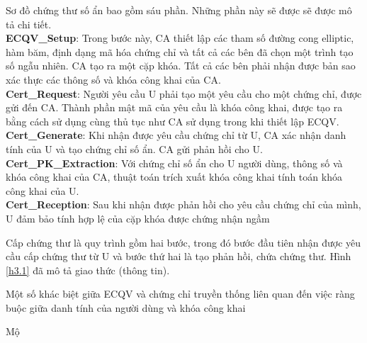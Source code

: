 \documentclass[a4paper,12pt]{report}
\begin{document}
Sơ đồ chứng thư số ẩn bao gồm sáu phần. Những phần này sẽ được sẽ được mô tả chi tiết.\\
\textbf{ECQV\_Setup}: Trong bước này, CA thiết lập các tham số đường cong elliptic, hàm băm, định dạng mã hóa chứng chỉ và tất cả các bên đã chọn một trình tạo số ngẫu nhiên. CA tạo ra một cặp khóa. Tất cả các bên phải nhận được bản sao xác thực các thông số và khóa công khai của CA. \\[6pt]
\textbf{Cert\_Request}: Người yêu cầu U phải tạo một yêu cầu cho một chứng chỉ, được gửi đến CA. Thành phần mật mã của yêu cầu là khóa công khai, được tạo ra bằng cách sử dụng cùng thủ tục như CA sử dụng trong khi thiết lập ECQV. \\ [6pt]
\textbf{Cert\_Generate}: Khi nhận được yêu cầu chứng chỉ từ U, CA xác nhận danh tính của U và tạo chứng chỉ số ẩn. CA gửi phản hồi cho U. \\ [6pt]
\textbf{Cert\_PK\_Extraction}: Với chứng chỉ số ẩn cho U người dùng, thông số và khóa công khai của CA, thuật toán trích xuất khóa công khai tính toán khóa công khai của U. \\ [6pt]
\textbf{Cert\_Reception}: Sau khi nhận được phản hồi cho yêu cầu chứng chỉ của mình, U đảm bảo tính hợp lệ của cặp khóa được chứng nhận ngầm

Cấp chứng thư là quy trình gồm hai bước, trong đó bước đầu tiên nhận được yêu cầu cấp chứng thư từ U và bước thứ hai là tạo phản hồi, chứa chứng thư. Hình \ref{h3.1} đã mô tả giao thức (thông tin).

Một số khác biệt giữa ECQV và chứng chỉ truyền thống liên quan đến việc ràng buộc giữa danh tính của người dùng và khóa công khai

Mộ
\end{document}
